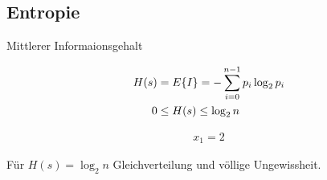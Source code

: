 \documentclass[10pt,a4paper]{article}
\begin{document}
  \subsection{Entropie}
  Mittlerer Informaionsgehalt
  \begin{mdframed}[style=exercise]
    \begin{align}
      H(s) &= E\qty{I} = -\sum_{i=0}^{n-1} p_i \log_2 p_i\\
      0 &\leq H(s) \leq \log_2 n
    \end{align}
  \end{mdframed}
  \begin{mdframed}[style=exercise]
    \begin{align}
      x_1 = 2
    \end{align}
  \end{mdframed}
  Für $H(s)=\log_2 n$ Gleichverteilung und völlige Ungewissheit.


  
\end{document}
